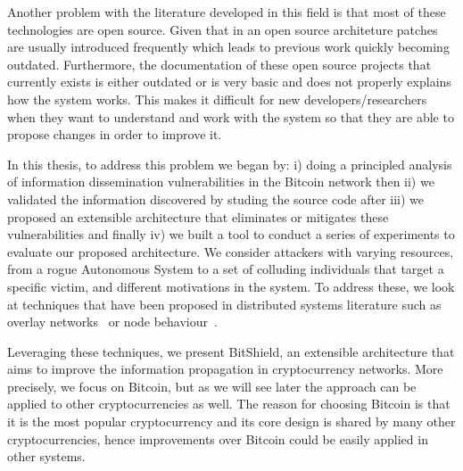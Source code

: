 Another problem with the literature developed in this field is that most of these technologies are open source. Given that in an open source architeture patches are usually introduced frequently which leads to previous work quickly becoming outdated.
Furthermore, the documentation of these open source projects that currently exists is either outdated or is very basic and does not properly explains how the system works.
This makes it difficult for new developers/researchers when they want to understand and work with the system so that they are able to propose changes in order to improve it.

In this thesis, to address this problem we began by: i) doing a principled analysis of information dissemination vulnerabilities in the Bitcoin network then ii) we validated the information discovered by studing the source code after iii) we proposed an extensible architecture that eliminates or mitigates these vulnerabilities and finally iv) we built a tool to conduct a series of experiments to evaluate our proposed architecture.
We consider attackers with varying resources, from a rogue Autonomous System to a set of colluding individuals that target a specific victim, and different motivations in the system.
To address these, we look at techniques that have been proposed in distributed systems literature such as overlay networks~\cite{jesi2009secure} or node behaviour~\cite{li2006bar}.

Leveraging these techniques, we present BitShield, an extensible architecture that aims to improve the information propagation in cryptocurrency networks. More precisely, we focus on Bitcoin, but as we will see later the approach can be applied to other cryptocurrencies as well. The reason for choosing Bitcoin is that it is the most popular cryptocurrency and its core design is shared by many other cryptocurrencies, hence improvements over Bitcoin could be easily applied in other systems.


